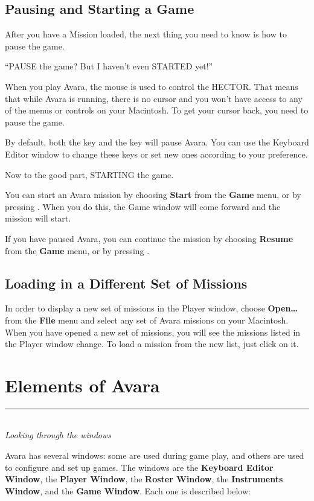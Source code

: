 \documentclass{article}
\let\oldsection\section
\renewcommand\section{\clearpage\oldsection}
\begin{document}
\subsection{Pausing and Starting a Game}
After you have a Mission loaded, the next thing you need to know is how to pause the game.

``PAUSE the game? But I haven't even STARTED yet!''

When you play Avara, the mouse is used to control the HECTOR. That means that while Avara is running, there is no cursor and you won't have access to any of the menus or controls on your Macintosh. To get your cursor back, you need to pause the game.

By default, both the \textbf{} key and the \textbf{} key will pause Avara. You can use the Keyboard Editor window to change these keys or set new ones according to your preference.

Now to the good part, STARTING the game.

You can start an Avara mission by choosing \textbf{Start} from the \textbf{Game} menu, or by pressing \textbf{}. When you do this, the Game window will come forward and the mission will start.

If you have paused Avara, you can continue the mission by choosing \textbf{Resume} from the \textbf{Game} menu, or by pressing \textbf{}.

\subsection{Loading in a Different Set of Missions}
In order to display a new set of missions in the Player window, choose \textbf{Open\dots} from the \textbf{File} menu and select any set of Avara missions on your Macintosh. When you have opened a new set of missions, you will see the missions listed in the Player window change. To load a mission from the new list, just click on it.


\section{Elements of Avara}
\rule{5.5cm}{.15pt}\\
\rmfamily\textit{Looking through the windows}

Avara has several windows: some are used during game play, and others are used to configure and set up games. The windows are the \textbf{Keyboard Editor Window}, the \textbf{Player Window}, the \textbf{Roster Window}, the \textbf{Instruments Window}, and the \textbf{Game Window}. Each one is described below:
\end{document}
